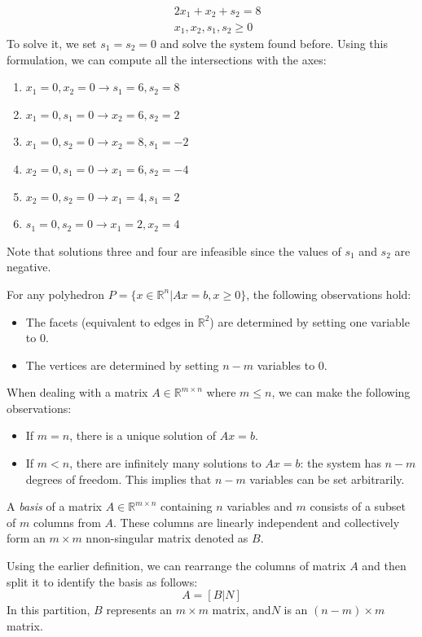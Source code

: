 \documentclass[12pt, a4paper]{report}
\begin{document}
\begin{example}
\begin{align*}
                                        &\: 2x_1+x_2+s_2 = 8  \\
                                        &\: x_1,x_2,s_1,s_2 \geq 0
        \end{align*}
        To solve it, we set $s_1=s_2=0$ and solve the system found before.
        Using this formulation, we can compute all the intersections with the axes:
        \begin{enumerate}
            \item $x_1=0,x_2=0 \rightarrow s_1=6,s_2=8$
            \item $x_1=0,s_1=0 \rightarrow x_2=6,s_2=2$
            \item $x_1=0,s_2=0 \rightarrow x_2=8,s_1=-2$
            \item $x_2=0,s_1=0 \rightarrow x_1=6,s_2=-4$
            \item $x_2=0,s_2=0 \rightarrow x_1=4,s_1=2$
            \item $s_1=0,s_2=0 \rightarrow x_1=2,x_2=4$
        \end{enumerate}
        Note that solutions three and four are infeasible since the values of $s_1$ and $s_2$ are negative. 
    \end{example}
    \begin{property}
        For any polyhedron $P = \{x \in \mathbb{R}^n|Ax = b,x \geq 0\}$, the following observations hold:
        \begin{itemize}
            \item The facets (equivalent to edges in $\mathbb{R}^2$) are determined by setting one variable to 0. 
            \item The vertices are determined by setting $n-m$ variables to 0. 
        \end{itemize}
    \end{property}
    When dealing with a matrix  $A \in \mathbb{R}^{m \times n}$ where $m \leq n$, we can make the following observations:
    \begin{itemize}
        \item If $m=n$, there is a unique solution of $Ax = b$.
        \item If $m<n$, there are infinitely many solutions to  $Ax = b$: the system has $n-m$ degrees of freedom. 
            This implies that $n-m$ variables can be set arbitrarily. 
    \end{itemize}
    \begin{definition}
        A \emph{basis} of a matrix $A \in \mathbb{R}^{m \times n}$ containing  $n$ variables and $m$ consists of a subset of $m$ columns from $A$. 
        These columns are linearly independent and collectively form an $m \times m$ nnon-singular matrix denoted as $B$. 
    \end{definition}
    Using the earlier definition, we can rearrange the columns of matrix $A$ and then split it to identify the basis as follows:
    \[A=\left[ B|N \right]\]
    In this partition, $B$ represents an $m \times m$ matrix, and$N$ is an $(n-m) \times m$ matrix.
\end{document}
